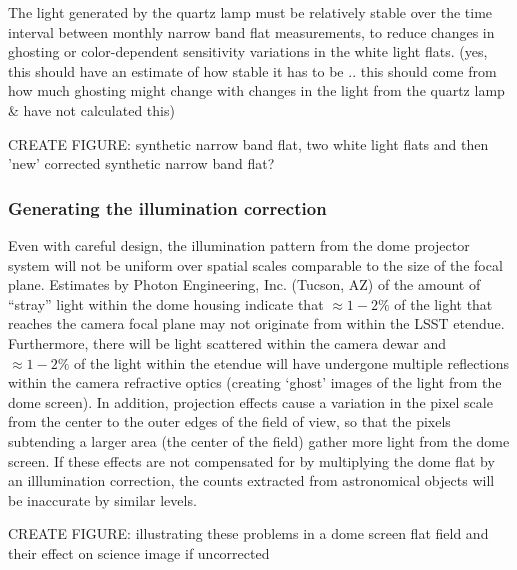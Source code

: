 \documentclass[12pt,preprint]{aastex}
\begin{document}
The light generated by the quartz lamp must be relatively stable over
the time interval between monthly narrow band flat measurements, to
reduce changes in ghosting or color-dependent sensitivity variations
in the white light flats.
(yes, this should have an estimate of how stable it has to be .. this
should come from how much ghosting might change with changes in the
light from the quartz lamp \& have not calculated this)

CREATE FIGURE: synthetic narrow band flat, two white light flats and then 'new'
corrected synthetic narrow band flat?

\subsubsection{Generating the illumination correction}

Even with careful design, the illumination pattern from the dome
projector system will not be uniform over spatial scales comparable to
the size of the focal plane. Estimates by Photon Engineering,
Inc. (Tucson, AZ) of the amount of ``stray'' light within the dome
housing indicate that $\approx 1−2\%$ of the light that reaches the
camera focal plane may not originate from within the LSST etendue.
Furthermore, there will be light scattered within the camera dewar and
$\approx 1-2\%$ of the light within the etendue will have undergone
multiple reflections within the camera refractive optics (creating
`ghost' images of the light from the dome screen). In addition,
projection effects cause a variation in the pixel scale from the
center to the outer edges of the field of view, so that the pixels
subtending a larger area (the center of the field) gather more light
from the dome screen. If these effects are not compensated for by
multiplying the dome flat by an illlumination correction, the counts
extracted from astronomical objects will be inaccurate by similar
levels.

CREATE FIGURE: illustrating these problems in a dome screen flat field
and their effect on science image if uncorrected
\end{document}
